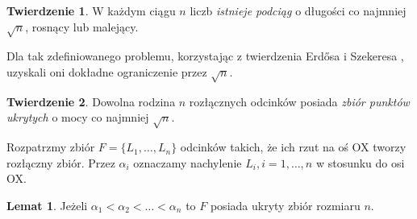 \documentclass[brudnopis]{xmgr}
\theoremstyle{definition}
\newtheorem{Twierdzenie}{Twierdzenie}
\newtheorem{Lemat}{Lemat}
\begin{document}
\begin{Twierdzenie}\label{podciag rosnacy} \cite{illumination}
  W każdym ciągu $n$ liczb \emph{istnieje podciąg} o długości co najmniej $\sqrt{n}$, rosnący lub malejący.
\end{Twierdzenie}

Dla tak zdefiniowanego problemu, korzystając z twierdzenia Erd{\H o}sa i Szekeresa \cite{erdosszekeres}, uzyskali oni dokładne ograniczenie przez $\sqrt{n}$.

\begin{Twierdzenie}\label{moc zbioru ukrytego tw} \cite{illumination}
  Dowolna rodzina $n$ rozłącznych odcinków posiada \emph{zbiór punktów ukrytych} o mocy co najmniej $\sqrt{n}$.
\end{Twierdzenie}

Rozpatrzmy zbiór $F = \{L_1,\ldots,L_n\}$ odcinków takich, że ich rzut na oś OX tworzy rozłączny zbiór. Przez $\alpha_i$ oznaczamy nachylenie $L_i, i = 1,\ldots,n$ w stosunku do osi OX.
\begin{Lemat}\label{zbior ukryty}
  Jeżeli $\alpha_1 < \alpha_2 < \ldots < \alpha_n$ to $F$ posiada ukryty zbiór rozmiaru $n$.
\end{Lemat}
\end{document}

